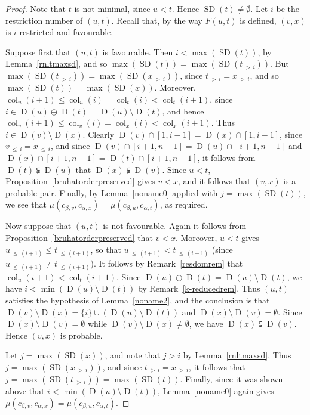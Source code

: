 \documentclass[ALCO,ThmDefs,Unicode,epreuves]{cedram}
\DeclareMathOperator{\col}{col}
\newcommand{\morethan}[2]{#1\,{_{>\,#2}}}
\newcommand{\Lessthan}[2]{#1\,{_{\leqslant\,#2}}}
\DeclareMathOperator{\SD}{SD}
\DeclareMathOperator{\D}{D}
\begin{document}
\begin{proof}
Note that $t$ is not minimal, since $u<t$. Hence $\SD(t)\ne\emptyset$.
Let $i$ be the restriction number of $(u,t)$. Recall that, by the
way $F(u,t)$ is defined, $(v,x)$ is $i$-restricted and favourable.

Suppose first that $(u,t)$ is favourable. Then $i<\max(\SD(t))$, by
Lemma~\ref{rnltmaxsd}, and so $\max(\SD(t))=\max(\SD(\morethan ti))$. But
$\max(\SD(\morethan ti))=\max(\SD(\morethan xi))$,
since $\morethan ti=\morethan xi$, and so
$\max(\SD(t))=\max(\SD(x))$. Moreover,
$\col_u(i+1)\leqslant\col_u(i)=\col_t(i)<\col_t(i+1)$, since
$i\in\D(u)\oplus\D(t)=\D(u)\setminus\D(t)$, and hence
$\col_v(i+1)\leqslant\col_v(i)=\col_x(i)<\col_x(i+1)$.
Thus $i\in\D(v)\setminus\D(x)$. Clearly $\D(v)\cap[1,i-1]=\D(x)\cap[1,i-1]$,
since $\Lessthan vi=\Lessthan xi$, and since $\D(v)\cap[i+1,n-1]=\D(u)\cap[i+1,n-1]$
and $\D(x)\cap[i+1,n-1]=\D(t)\cap[i+1,n-1]$, it follows from
$\D(t)\subsetneqq\D(u)$ that $\D(x)\subsetneqq\D(v)$. Since $u<t$,
Proposition~\ref{bruhatorderpreserved} gives $v<x$, and it follows that
$(v,x)$ is a probable pair. Finally, by Lemma~\ref{noname0}
applied with $j=\max(\SD(t))$, we see that
$\mu(c_{\beta,v},c_{\alpha,x})=\mu(c_{\beta,u},c_{\alpha,t})$,
as required.

Now suppose that $(u,t)$ is not favourable. Again it
follows from Proposition~\ref{bruhatorderpreserved} that $v<x$.
Moreover, $u<t$ gives $\Lessthan u{(i+1)}\leqslant\Lessthan t{(i+1)}$,
so that $\Lessthan u{(i+1)} < \Lessthan t{(i+1)}$ (since
$\Lessthan u{(i+1)}\neq\Lessthan t{(i+1)}$). It follows by
Remark~\ref{resdomrem} that $\col_u(i+1)<\col_t(i+1)$.
Since $\D(u)\oplus\D(t)=\D(u)\setminus\D(t)$,
we have $i<\min(\D(u)\setminus\D(t))$ by Remark~\ref{k-reducedrem}.
Thus $(u,t)$ satisfies the hypothesis of Lemma~\ref{noname2},
and the conclusion is that
$\D(v)\setminus\D(x)=\{i\}\cup(\D(u)\setminus\D(t))$ and $\D(x)\setminus\D(v)=\emptyset$.
Since $\D(x)\setminus\D(v)=\emptyset$ while $\D(v)\setminus\D(x)\neq\emptyset$,
we have $\D(x)\subsetneqq\D(v)$. Hence $(v,x)$ is probable.

Let $j=\max(\SD(x))$, and note that $j>i$ by Lemma~\ref{rnltmaxsd},
Thus $j=\max(\SD(\morethan xi))$, and since $\morethan ti = \morethan xi$,
it follows that $j=\max(\SD(\morethan ti))=\max(\SD(t))$.
Finally, since it was shown above that $i<\min(\D(u)\setminus\D(t))$,
Lemma~\ref{noname0} again gives
$\mu(c_{\beta,v},c_{\alpha,x})=\mu(c_{\beta,u},c_{\alpha,t})$.
\end{proof}
\end{document}

